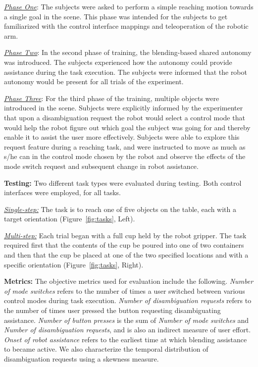 \documentclass[natbib, twocolumn]{svjour3}          %
\begin{document}
\noindent\underline{\textit{Phase One}}: The subjects were asked to perform a simple reaching motion towards a single goal in the scene. This phase was intended for the subjects to get familiarized with the control interface mappings and teleoperation of the robotic arm. 

\noindent\underline{\textit{Phase Two}}: In the second phase of training, the blending-based shared autonomy was introduced. The subjects experienced how the autonomy could provide assistance during the task execution. The subjects were informed that the robot autonomy would be present for all trials of the experiment. 

\noindent\underline{\textit{Phase Three}}: For the third phase of the training, multiple objects were introduced in the scene. 
Subjects were explicitly informed by the experimenter that upon a disambiguation request the robot would select a control mode that would help the robot figure out which goal the subject was going for and thereby enable it to assist the user more effectively.
Subjects were able to explore this request feature during a reaching task, and were instructed to move as much as s/he can in the control mode chosen by the robot and observe the effects of the mode switch request and subsequent change in robot assistance. 

\noindent\textbf{Testing:} Two different task types were evaluated during testing. Both control interfaces were employed, for all tasks.

\noindent\underline{\textit{Single-step:}} The task is to reach one of five objects on the table, each with a target orientation (Figure~\ref{fig:tasks}, Left). 

\noindent\underline{\textit{Multi-step:}} Each trial began with a full cup held by the robot gripper. The task required first that the contents of the cup be poured into one of two containers and then that the cup be placed at one of the two specified locations and with a specific orientation (Figure~\ref{fig:tasks}, Right). 


\noindent\textbf{Metrics:}
The objective metrics used for evaluation include the following. \textit{Number of mode switches} refers to the number of times a user switched between various control modes during task execution. \textit{Number of disambiguation requests} refers to the number of times user pressed the button requesting disambiguating assistance. \textit{Number of button presses} is the sum of \textit{Number of mode switches} and \textit{Number of disambiguation requests}, and is also an indirect measure of user effort. \textit{Onset of robot assistance} refers to the earliest time at which blending assistance to became active. We also characterize the temporal distribution of disambiguation requests using a skewness measure. 
\end{document}
